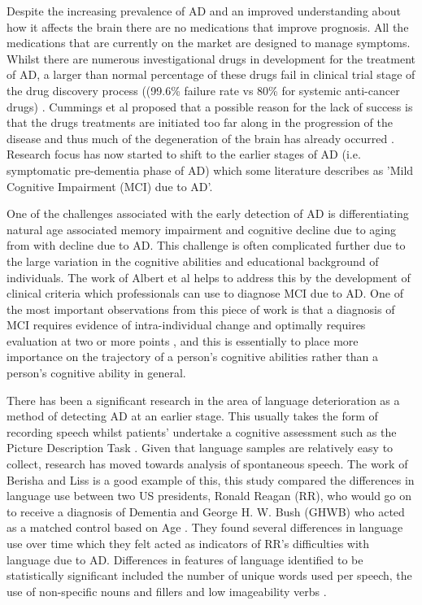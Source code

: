 \documentclass[12pt]{article}
\begin{document}
\par
Despite the increasing prevalence of AD and an improved understanding about how it affects the brain there are no medications that improve prognosis. All the medications that are currently on the market are designed to manage symptoms. Whilst there are numerous investigational drugs in development for the treatment of AD, a larger than normal percentage of these drugs fail in clinical trial stage of the drug discovery process ((99.6\% failure rate vs 80\% for systemic anti-cancer drugs) \cite{Cummings2014}. Cummings et al proposed that a possible reason for the lack of success is that the drugs treatments are initiated too far along in the progression of the disease and thus much of the degeneration of the brain has already occurred \cite{Cummings2014}. Research focus has now started to shift to the earlier stages of AD (i.e. symptomatic pre-dementia phase of AD) which some literature describes as 'Mild Cognitive Impairment (MCI) due to AD'.
\par
One of the challenges associated with the early detection of AD is differentiating natural age associated memory impairment and cognitive decline due to aging from with decline due to AD. This challenge is often complicated further due to the large variation in the cognitive abilities and educational background of individuals. The work of Albert et al helps to address this by the development of clinical criteria which professionals can use to diagnose MCI due to AD. One of the most important observations from this piece of work is that a diagnosis of MCI requires evidence of intra-individual change and optimally requires evaluation at two or more points \cite{Albert2011}, and this is essentially to place more importance on the trajectory of a person's cognitive abilities rather than a person's cognitive ability in general. 
\par 
There has been a significant research in the area of language deterioration as a method of detecting AD at an earlier stage. This usually takes the form of recording speech whilst patients' undertake a cognitive assessment such as the Picture Description Task \cite{Orimaye2014,Fraser2015}. Given that language samples are relatively easy to collect, research has moved towards analysis of spontaneous speech. The work of Berisha and Liss is a good example of this, this study compared the differences in language use between two US presidents, Ronald Reagan (RR), who would go on to receive a diagnosis of Dementia and George H. W. Bush (GHWB) who acted as a matched control based on Age \cite{Berisha2015}. They found several differences in language use over time which they felt acted as indicators of RR's difficulties with language due to AD. Differences in features of language identified to be statistically significant included the number of unique words used per speech, the use of non-specific nouns and fillers and low imageability verbs \cite{Berisha2015}. 
\end{document}
